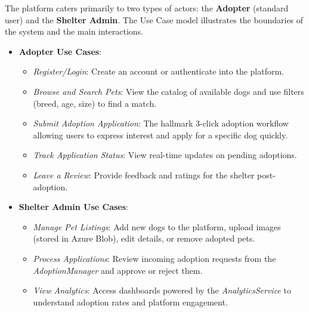 The platform caters primarily to two types of actors: the \textbf{Adopter} (standard user) and the \textbf{Shelter Admin}. The Use Case model illustrates the boundaries of the system and the main interactions.

\begin{itemize}
    \item \textbf{Adopter Use Cases}:
    \begin{itemize}
        \item \textit{Register/Login}: Create an account or authenticate into the platform.
        \item \textit{Browse and Search Pets}: View the catalog of available dogs and use filters (breed, age, size) to find a match.
        \item \textit{Submit Adoption Application}: The hallmark 3-click adoption workflow allowing users to express interest and apply for a specific dog quickly.
        \item \textit{Track Application Status}: View real-time updates on pending adoptions.
        \item \textit{Leave a Review}: Provide feedback and ratings for the shelter post-adoption.
    \end{itemize}
    
    \item \textbf{Shelter Admin Use Cases}:
    \begin{itemize}
        \item \textit{Manage Pet Listings}: Add new dogs to the platform, upload images (stored in Azure Blob), edit details, or remove adopted pets.
        \item \textit{Process Applications}: Review incoming adoption requests from the \textit{AdoptionManager} and approve or reject them.
        \item \textit{View Analytics}: Access dashboards powered by the \textit{AnalyticsService} to understand adoption rates and platform engagement.
    \end{itemize}
\end{itemize}
